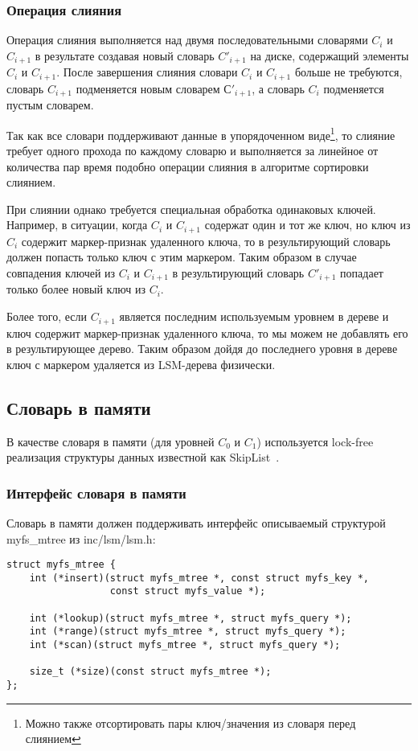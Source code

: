 \subsubsection{Операция слияния}

Операция слияния выполняется над двумя последовательными словарями $C_i$ и
$C_{i+1}$ в результате создавая новый словарь $C'_{i+1}$ на диске, содержащий
элементы $C_i$ и $C_{i+1}$. После завершения слияния словари $C_i$ и $C_{i+1}$
больше не требуются, словарь $C_{i+1}$ подменяется новым словарем $С'_{i+1}$,
а словарь $C_i$ подменяется пустым словарем.

Так как все словари поддерживают данные в упорядоченном виде\footnote{Можно
также отсортировать пары ключ/значения из словаря перед слиянием}, то слияние
требует одного прохода по каждому словарю и выполняется за линейное от
количества пар время подобно операции слияния в алгоритме сортировки слиянием.

При слиянии однако требуется специальная обработка одинаковых ключей. Например,
в ситуации, когда $C_i$ и $C_{i+1}$ содержат один и тот же ключ, но ключ из
$C_i$ содержит маркер-признак удаленного ключа, то в результирующий словарь
должен попасть только ключ с этим маркером. Таким образом в случае совпадения
ключей из $C_i$ и $C_{i+1}$ в результирующий словарь $C'_{i+1}$ попадает только
более новый ключ из $C_i$.

Более того, если $C_{i+1}$ является последним используемым уровнем в дереве и
ключ содержит маркер-признак удаленного ключа, то мы можем не добавлять его в
результирующее дерево. Таким образом дойдя до последнего уровня в дереве ключ
с маркером удаляется из LSM-дерева физически.


\subsection{Словарь в памяти}

В качестве словаря в памяти (для уровней $C_0$ и $C_1$) используется lock-free
реализация структуры данных известной как SkipList~\cite{SKIP}.


\subsubsection{Интерфейс словаря в памяти}

Словарь в памяти должен поддерживать интерфейс описываемый структурой
myfs\_mtree из inc/lsm/lsm.h:
\begin{lstlisting}
struct myfs_mtree {
    int (*insert)(struct myfs_mtree *, const struct myfs_key *,
                  const struct myfs_value *);

    int (*lookup)(struct myfs_mtree *, struct myfs_query *);
    int (*range)(struct myfs_mtree *, struct myfs_query *);
    int (*scan)(struct myfs_mtree *, struct myfs_query *);

    size_t (*size)(const struct myfs_mtree *);
};
\end{lstlisting}

